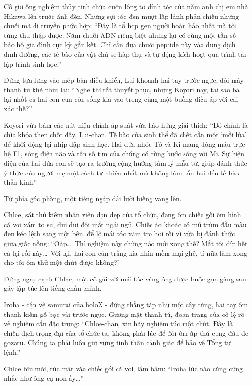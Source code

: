 \documentclass[../main.tex]{subfiles}
\begin{document}
Cô giơ ống nghiệm thủy tinh chứa cuộn lông tơ dính tóc của năm anh chị em nhà Hikawa lên trước ánh đèn. Những sợi tóc đen mượt lấp lánh phản chiếu những chuỗi mã di truyền phức hợp: ``Đây là tổ hợp gen người hoàn hảo nhất mà tôi từng thu thập được. Năm chuỗi ADN riêng biệt nhưng lại có cùng một tần số bảo hộ gia đình cực kỳ gắn kết. Chỉ cần đưa chuỗi peptide này vào dung dịch dinh dưỡng, các tế bào của vật chủ sẽ hấp thụ và tự động kích hoạt quá trình tái lập trình sinh học.''

Đứng tựa lưng vào mép bàn điều khiển, Lui khoanh hai tay trước ngực, đôi mày thanh tú khẽ nhíu lại: ``Nghe thì rất thuyết phục, nhưng Koyori này, tại sao bà lại nhốt cả hai con cún còn sống kia vào trong cùng một buồng điều áp với cái xác thế?''

Koyori vừa bấm các nút hiệu chỉnh áp suất vừa hào hứng giải thích: ``Đó chính là chìa khóa then chốt đấy, Lui-chan. Tế bào của sinh thể đã chết cần một `mồi lửa' để khởi động lại nhịp đập sinh học. Hai đứa nhóc Tô và Ki mang dòng máu trực hệ F1, sóng điện não và tần số tim của chúng có cùng bước sóng với Mi. Sự hiện diện của hai đứa con sẽ tạo ra trường cộng hưởng tâm lý mẫu tử, giúp đánh thức ý thức của người mẹ một cách tự nhiên nhất mà không làm tổn hại đến tế bào thần kinh.''

Từ phía góc phòng, một tiếng ngáp dài lười biếng vang lên.

Chloe, sát thủ kiêm nhân viên dọn dẹp của tổ chức, đang ôm chiếc gối ôm hình cá voi xám to sụ, dụi dụi đôi mắt ngái ngủ. Chiếc áo khoác có mũ trùm đầu màu đen kéo lệch sang một bên, để lộ mái tóc xám tro hơi rối vì vừa bị đánh thức giữa giấc nồng: ``Oáp\dots\ Thí nghiệm này chừng nào mới xong thế? Mắt tôi díp hết cả lại rồi này\dots\ Với lại, hai con cún trắng kia nhìn mềm mại ghê, tí nữa làm xong cho tôi ôm thử một chút được không?''

Đứng ngay cạnh Chloe, một cô gái với mái tóc vàng óng được buộc gọn gàng sau gáy lập tức lên tiếng chấn chỉnh.

Iroha - cận vệ samurai của holoX - đứng thẳng tắp như một cây tùng, hai tay ôm thanh kiếm gỗ bọc vải trước ngực. Gương mặt thanh tú, đoan trang của cô lộ rõ vẻ nghiêm cẩn đặc trưng: ``Chloe-chan, xin hãy nghiêm túc một chút. Đây là chiến dịch trọng đại của tổ chức ta, không phải lúc để đòi ôm ấp thú cưng đâu-de gozaru. Chúng ta phải luôn giữ vững tinh thần cảnh giác để bảo vệ Tổng tư lệnh.''

Chloe bĩu môi, rúc mặt vào chiếc gối cá voi, lẩm bẩm: ``Iroha lúc nào cũng cứng nhắc như ông cụ non ấy\dots''
\end{document}
